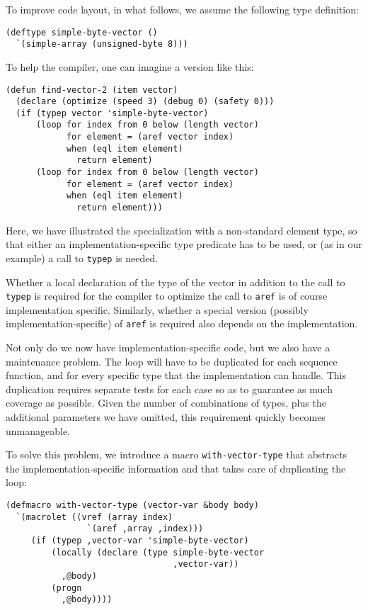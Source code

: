 To improve code layout, in what follows, we assume the following type
definition:

{\small\begin{verbatim}
(deftype simple-byte-vector ()
  `(simple-array (unsigned-byte 8)))
\end{verbatim}}

To help the compiler, one can imagine a version like this:

{\small\begin{verbatim}
(defun find-vector-2 (item vector)
  (declare (optimize (speed 3) (debug 0) (safety 0)))
  (if (typep vector 'simple-byte-vector)
      (loop for index from 0 below (length vector)
            for element = (aref vector index)
            when (eql item element)
              return element)
      (loop for index from 0 below (length vector)
            for element = (aref vector index)
            when (eql item element)
              return element)))
\end{verbatim}}

Here, we have illustrated the specialization with a non-standard
element type, so that either an implementation-specific type predicate
has to be used, or (as in our example) a call to \texttt{typep} is
needed.

Whether a local declaration of the type of the vector in addition to
the call to \texttt{typep} is required for the compiler to optimize
the call to \texttt{aref} is of course implementation specific.
Similarly, whether a special version (possibly
implementation-specific) of \texttt{aref} is required also depends on
the implementation.

Not only do we now have implementation-specific code, but we also
have a maintenance problem.  The loop will have to be duplicated for
each sequence function, and for every specific type that the
implementation can handle.  This duplication requires separate tests
for each case so as to guarantee as much coverage as possible.  Given
the number of combinations of types, plus the additional parameters we
have omitted, this requirement quickly becomes unmanageable.

To solve this problem, we introduce a macro \texttt{with-vector-type} that
abstracts the implementation-specific information and that takes care
of duplicating the loop:

{\small\begin{verbatim}
(defmacro with-vector-type (vector-var &body body)
  `(macrolet ((vref (array index)
                `(aref ,array ,index)))
     (if (typep ,vector-var 'simple-byte-vector)
         (locally (declare (type simple-byte-vector
                                 ,vector-var))
           ,@body)
         (progn
           ,@body))))
\end{verbatim}}

